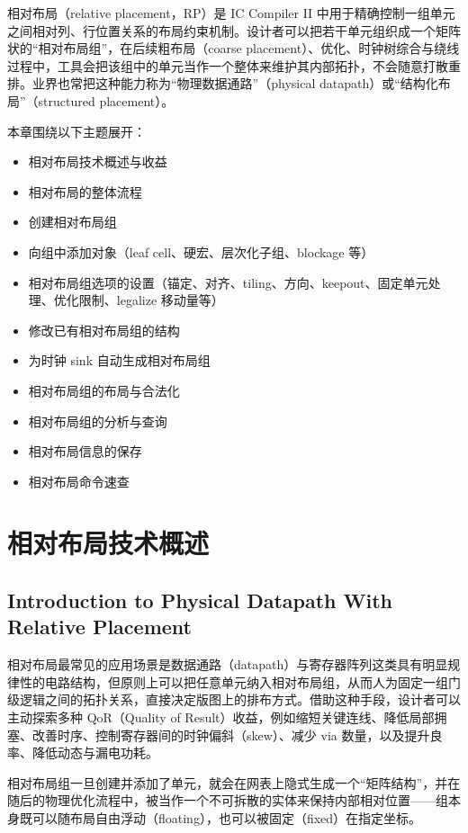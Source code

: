 \label{chap:rp}

相对布局（relative placement，RP）是 IC Compiler II 中用于精确控制一组单元之间相对列、行位置关系的布局约束机制。设计者可以把若干单元组织成一个矩阵状的“相对布局组”，在后续粗布局（coarse placement）、优化、时钟树综合与绕线过程中，工具会把该组中的单元当作一个整体来维护其内部拓扑，不会随意打散重排。业界也常把这种能力称为“物理数据通路”（physical datapath）或“结构化布局”（structured placement）。

本章围绕以下主题展开：
\begin{itemize}
  \item 相对布局技术概述与收益
  \item 相对布局的整体流程
  \item 创建相对布局组
  \item 向组中添加对象（leaf cell、硬宏、层次化子组、blockage 等）
  \item 相对布局组选项的设置（锚定、对齐、tiling、方向、keepout、固定单元处理、优化限制、legalize 移动量等）
  \item 修改已有相对布局组的结构
  \item 为时钟 sink 自动生成相对布局组
  \item 相对布局组的布局与合法化
  \item 相对布局组的分析与查询
  \item 相对布局信息的保存
  \item 相对布局命令速查
\end{itemize}

\section{相对布局技术概述}
\subsection*{Introduction to Physical Datapath With Relative Placement}

相对布局最常见的应用场景是数据通路（datapath）与寄存器阵列这类具有明显规律性的电路结构，但原则上可以把任意单元纳入相对布局组，从而人为固定一组门级逻辑之间的拓扑关系，直接决定版图上的排布方式。借助这种手段，设计者可以主动探索多种 QoR（Quality of Result）收益，例如缩短关键连线、降低局部拥塞、改善时序、控制寄存器间的时钟偏斜（skew）、减少 via 数量，以及提升良率、降低动态与漏电功耗。

相对布局组一旦创建并添加了单元，就会在网表上隐式生成一个“矩阵结构”，并在随后的物理优化流程中，被当作一个不可拆散的实体来保持内部相对位置——组本身既可以随布局自由浮动（floating），也可以被固定（fixed）在指定坐标。

